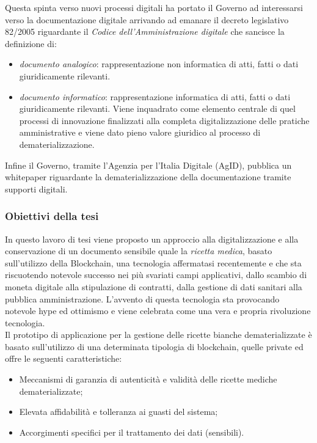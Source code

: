 Questa spinta verso nuovi processi digitali ha portato il Governo ad interessarsi verso la documentazione digitale arrivando ad emanare il decreto legislativo 82/2005 riguardante il \emph{Codice dell'Amministrazione digitale}\autocite{caddlg} che sancisce la definizione di:
\begin{itemize}
	\item \emph{documento analogico}: rappresentazione non informatica di atti, fatti o dati giuridicamente rilevanti.
	\item \emph{documento informatico}: rappresentazione informatica di atti, fatti o dati giuridicamente rilevanti. Viene inquadrato come elemento centrale di quel processi di innovazione finalizzati alla completa digitalizzazione delle pratiche amministrative e viene dato pieno valore giuridico al processo di dematerializzazione.
\end{itemize}
Infine il Governo, tramite l'Agenzia per l'Italia Digitale (AgID), pubblica un whitepaper riguardante la dematerializzazione della documentazione tramite supporti digitali.\autocite{whtpaperdema}
\subsubsection{Obiettivi della tesi}
In questo lavoro di tesi viene proposto un approccio alla digitalizzazione e alla conservazione di un documento sensibile quale la \emph{ricetta medica}, basato sull'utilizzo della Blockchain, una tecnologia affermatasi recentemente e che sta riscuotendo notevole successo nei più svariati campi applicativi, dallo scambio di moneta digitale alla stipulazione di contratti, dalla gestione di dati sanitari alla pubblica amministrazione. L'avvento di questa tecnologia sta provocando notevole hype ed ottimismo e viene celebrata come una vera e propria rivoluzione tecnologia. \\
Il prototipo di applicazione per la gestione delle ricette bianche dematerializzate è basato sull'utilizzo di una determinata tipologia di blockchain, quelle private ed offre le seguenti caratteristiche:
\begin{itemize}
	\item Meccanismi di garanzia di autenticità e validità delle ricette mediche dematerializzate;
	\item Elevata affidabilità e tolleranza ai guasti del sistema;
	\item Accorgimenti specifici per il trattamento dei dati (sensibili).
\end{itemize}
%
\clearpage
%
